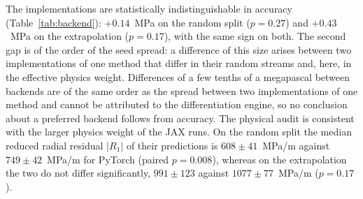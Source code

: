 \documentclass[subscriptcorrection,upint,varvw,barcolor=Goldenrod3,mathalfa=cal=euler,balance,hyphenate,french,pdf-a]{asmejour} %
\begin{document}
The implementations are statistically indistinguishable in accuracy (Table~\ref{tab:backend}): $+0.14$~MPa on the random split ($p=0.27$) and $+0.43$~MPa on the extrapolation ($p=0.17$), with the same sign on both. The second gap is of the order of the seed spread: a difference of this size arises between two implementations of one method that differ in their random streams and, here, in the effective physics weight. %
Differences of a few tenths of a megapascal between backends are of the same order as the
spread between two implementations of one method and cannot be attributed to the differentiation
engine, so no conclusion about a preferred backend follows from accuracy.
The physical audit is consistent with the larger physics weight of the JAX runs. On the random split the median reduced radial residual $|R_1|$ of their predictions is $608\pm41$~MPa/m against $749\pm42$~MPa/m for PyTorch (paired $p=0.008$), whereas on the extrapolation the two do not differ significantly, $991\pm123$ against $1077\pm77$~MPa/m ($p=0.17$).
\end{document}
